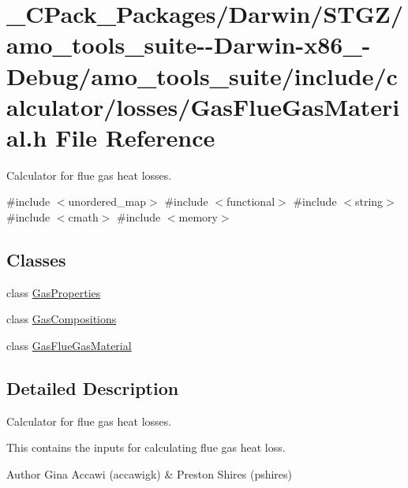\hypertarget{___c_pack___packages_2_darwin_2_s_t_g_z_2amo__tools__suite--_darwin-x86__64-_debug_2amo__tools__4660f703408c33ec3ee2abb47d5010e4}{}\section{\+\_\+\+C\+Pack\+\_\+\+Packages/\+Darwin/\+S\+T\+G\+Z/amo\+\_\+tools\+\_\+suite-\/-\/\+Darwin-\/x86\+\_-\/\+Debug/amo\+\_\+tools\+\_\+suite/include/calculator/losses/\+Gas\+Flue\+Gas\+Material.h File Reference}
\label{___c_pack___packages_2_darwin_2_s_t_g_z_2amo__tools__suite--_darwin-x86__64-_debug_2amo__tools__4660f703408c33ec3ee2abb47d5010e4}


Calculator for flue gas heat losses.  


{\ttfamily \#include $<$unordered\+\_\+map$>$}\newline
{\ttfamily \#include $<$functional$>$}\newline
{\ttfamily \#include $<$string$>$}\newline
{\ttfamily \#include $<$cmath$>$}\newline
{\ttfamily \#include $<$memory$>$}\newline
\subsection*{Classes}
\begin{DoxyCompactItemize}
\item 
class \hyperlink{class_gas_properties}{Gas\+Properties}
\item 
class \hyperlink{class_gas_compositions}{Gas\+Compositions}
\item 
class \hyperlink{class_gas_flue_gas_material}{Gas\+Flue\+Gas\+Material}
\end{DoxyCompactItemize}


\subsection{Detailed Description}
Calculator for flue gas heat losses. 

This contains the inputs for calculating flue gas heat loss.

\begin{DoxyAuthor}{Author}
Gina Accawi (accawigk) \& Preston Shires (pshires) 
\end{DoxyAuthor}
